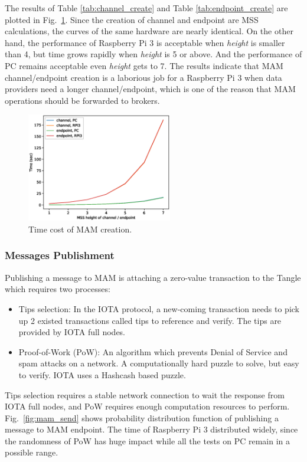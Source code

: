 \documentclass[conference]{IEEEtran}
\begin{document}
The results of Table \ref{tab:channel_create} and Table \ref{tab:endpoint_create} are plotted in Fig.~\ref{fig:mam_create}. Since the creation of channel and endpoint are MSS calculations, the curves of the same hardware are nearly identical. On the other hand, the performance of Raspberry Pi 3 is acceptable when \textit{height} is smaller than 4, but time grows rapidly when \textit{height} is 5 or above. And the performance of PC remains acceptable even \textit{height} gets to 7. The results indicate that MAM channel/endpoint creation is a laborious job for a Raspberry Pi 3 when data providers need a longer channel/endpoint, which is one of the reason that MAM operations should be forwarded to brokers.
  
\begin{figure}[!t]
    \centering
    \includegraphics[width=2.5in]{mam_create}
    \caption{Time cost of MAM creation.}
    \label{fig:mam_create}
\end{figure}

\subsubsection{Messages Publishment}
Publishing a message to MAM is attaching a zero-value transaction to the Tangle which requires two processes:
\begin{itemize}
	\item	Tips selection: In the IOTA protocol, a new-coming transaction needs to pick up 2 existed transactions called tips to reference and verify. The tips are provided by IOTA full nodes.
	\item	Proof-of-Work (PoW): An algorithm which prevents Denial of Service and spam attacks on a network. A computationally hard puzzle to solve, but easy to verify. IOTA uses a Hashcash\cite{Hashcash} based puzzle.
\end{itemize}

Tips selection requires a stable network connection to wait the response from IOTA full nodes, and PoW requires enough computation resources to perform. Fig.~\ref{fig:mam_send} shows probability distribution function of publishing a message to MAM endpoint. The time of Raspberry Pi 3 distributed widely, since the randomness of PoW has huge impact while all the tests on PC remain in a possible range.
\end{document}
